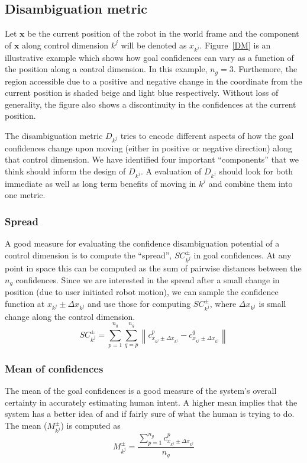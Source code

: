 \documentclass[conference]{IEEEtran}
\newcommand{\norm}[1]{\left\lVert#1\right\rVert}
\begin{document}
\subsection{Disambiguation metric}
Let $\boldsymbol{x}$ be the current position of the robot in the world frame and the component of $\boldsymbol{x}$ along control dimension $k^j$ will be denoted as $x_{k^j}$. 
Figure~\ref{DM} is an illustrative example which shows how goal confidences can vary as a function of the position along a control dimension. In this example, $n_g = 3$. Furthemore, the region accessible due to a positive and negative change in the coordinate from the current position is shaded beige and light blue respectively. Without loss of generality, the figure also shows a discontinuity in the confidences at the current position.

The disambiguation metric $D_{k^j}$ tries to encode different aspects of how the goal confidences change upon moving (either in positive or negative direction) along that control dimension. We have identified four important ``components'' that we think should inform the design of $D_{k^j}$. A evaluation of $D_{k^j}$ should look for both immediate as well as long term benefits of moving in $k^j$ and combine them into one metric.

\subsubsection{Spread}
A good measure for evaluating the confidence disambiguation potential of a control dimension is to compute the ``spread'', $SC^{\pm}_{k^j}$ in  goal confidences. At any point in space this can be computed as the sum of pairwise distances between the $n_g$ confidences. Since we are interested in the spread after a small change in position (due to user initiated robot motion), we can sample the confidence function at $x_{k^j}\pm\Delta x_{k^j}$ and use those for computing $SC^{\pm}_{k^j}$, where $\Delta x_{k^j}$ is small change along the control dimension.
\begin{equation*}
SC^{\pm}_{k^j} = \sum_{p=1}^{n_g}\sum_{q=p}^{n_g}\norm{c^{p}_{x_{k^j} \pm \Delta x_{k^j}} - c^{q}_{x_{k^j} \pm \Delta x_{k^j}} }
\end{equation*}
\subsubsection{Mean of confidences}
The mean of the goal confidences is a good measure of the system's overall certainty in accurately estimating human intent. A higher mean implies that the system has a better idea of and if fairly sure of what the human is trying to do. The mean ($M^{\pm}_{k^j}$) is computed as
\begin{equation*}
M^{\pm}_{k^j} = \frac{\sum_{p = 1}^{n_g}c^{p}_{x_{k^j}\pm\Delta x_{k^j}}}{n_g}
\end{equation*}
\end{document}
